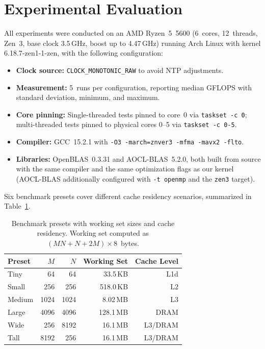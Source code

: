 \documentclass[conference]{IEEEtran}
\begin{document}
\section{Experimental Evaluation}
\label{sec:results}

All experiments were conducted on an AMD Ryzen~5~5600 (6~cores, 12~threads,
Zen~3, base clock 3.5\,GHz, boost up to 4.47\,GHz) running Arch Linux with
kernel 6.18.7-zen1-1-zen, with the following configuration:

\begin{itemize}
\item \textbf{Clock source:} \texttt{CLOCK\_MONOTONIC\_RAW} to avoid NTP
      adjustments.
\item \textbf{Measurement:} 5~runs per configuration, reporting median GFLOPS
      with standard deviation, minimum, and maximum.
\item \textbf{Core pinning:} Single-threaded tests pinned to core~0 via
      \texttt{taskset -c 0}; multi-threaded tests pinned to physical cores
      0--5 via \texttt{taskset -c 0-5}.
\item \textbf{Compiler:} GCC~15.2.1 with \texttt{-O3 -march=znver3 -mfma
      -mavx2 -flto}.
\item \textbf{Libraries:} OpenBLAS~0.3.31 and AOCL-BLAS~5.2.0, both built
      from source with the same compiler and the same optimization flags as
      our kernel (AOCL-BLAS additionally configured with \texttt{-t openmp}
      and the \texttt{zen3} target).
\end{itemize}

Six benchmark presets cover different cache residency scenarios, summarized in
Table~\ref{tab:presets}.

\begin{table}[tbp]
\centering
\caption{Benchmark presets with working set sizes and cache residency.
Working set computed as $(MN + N + 2M) \times 8$~bytes.}
\label{tab:presets}
\begin{tabular}{@{}lrrrr@{}}
\toprule
\textbf{Preset} & \textbf{$M$} & \textbf{$N$} & \textbf{Working Set} &
\textbf{Cache Level} \\
\midrule
Tiny   &   64 &   64 &   33.5\,KB & L1d \\
Small  &  256 &  256 &  518.0\,KB & L2 \\
Medium & 1024 & 1024 &  8.02\,MB  & L3 \\
Large  & 4096 & 4096 &  128.1\,MB & DRAM \\
Wide   &  256 & 8192 &  16.1\,MB  & L3/DRAM \\
Tall   & 8192 &  256 &  16.1\,MB  & L3/DRAM \\
\bottomrule
\end{tabular}
\end{table}
\end{document}
